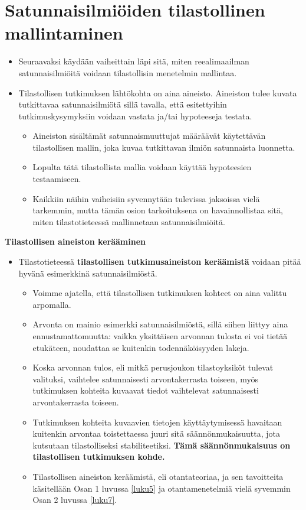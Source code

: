 \documentclass[
]{book}
\providecommand{\tightlist}{%
  \setlength{\itemsep}{0pt}\setlength{\parskip}{0pt}}
\begin{document}
\hypertarget{alaluku42}{%
\section{Satunnaisilmiöiden tilastollinen mallintaminen}\label{alaluku42}}

\begin{itemize}
\tightlist
\item
  Seuraavaksi käydään vaiheittain läpi sitä, miten reealimaailman satunnaisilmiöitä voidaan tilastollisin menetelmin mallintaa.
\item
  Tilastollisen tutkimuksen lähtökohta on aina aineisto. Aineiston tulee kuvata tutkittavaa satunnaisilmiötä sillä tavalla, että esitettyihin tutkimuskysymyksiin voidaan vastata ja/tai hypoteeseja testata.

  \begin{itemize}
  \tightlist
  \item
    Aineiston sisältämät satunnaismuuttujat määräävät käytettävän tilastollisen mallin, joka kuvaa tutkittavan ilmiön satunnaista luonnetta.
  \item
    Lopulta tätä tilastollista mallia voidaan käyttää hypoteesien testaamiseen.
  \item
    Kaikkiin näihin vaiheisiin syvennytään tulevissa jaksoissa vielä tarkemmin, mutta tämän osion tarkoituksena on havainnollistaa sitä, miten tilastotieteessä mallinnetaan satunnaisilmiöitä.
  \end{itemize}
\end{itemize}

\textbf{Tilastollisen aineiston kerääminen}

\begin{itemize}
\tightlist
\item
  Tilastotieteessä \textbf{tilastollisen tutkimusaineiston keräämistä} voidaan pitää hyvänä esimerkkinä satunnaisilmiöstä.

  \begin{itemize}
  \tightlist
  \item
    Voimme ajatella, että tilastollisen tutkimuksen kohteet on aina valittu arpomalla.
  \item
    Arvonta on mainio esimerkki satunnaisilmiöstä, sillä siihen liittyy aina ennustamattomuutta: vaikka yksittäisen arvonnan tulosta ei voi tietää etukäteen, noudattaa se kuitenkin todennäköisyyden lakeja.
  \item
    Koska arvonnan tulos, eli mitkä perusjoukon tilastoyksiköt tulevat valituksi, vaihtelee satunnaisesti arvontakerrasta toiseen, myös tutkimuksen kohteita kuvaavat tiedot vaihtelevat satunnaisesti arvontakerrasta toiseen.
  \item
    Tutkimuksen kohteita kuvaavien tietojen käyttäytymisessä havaitaan kuitenkin arvontaa toistettaessa juuri sitä säännönmukaisuutta, jota kutsutaan tilastolliseksi stabiliteetiksi. \textbf{Tämä säännönmukaisuus on tilastollisen tutkimuksen kohde.}
  \item
    Tilastollisen aineiston keräämistä, eli otantateoriaa, ja sen tavoitteita käsitellään Osan 1 luvussa \ref{luku5} ja otantamenetelmiä vielä syvemmin Osan 2 luvussa \ref{luku7}.
  \end{itemize}
\end{itemize}
\end{document}
